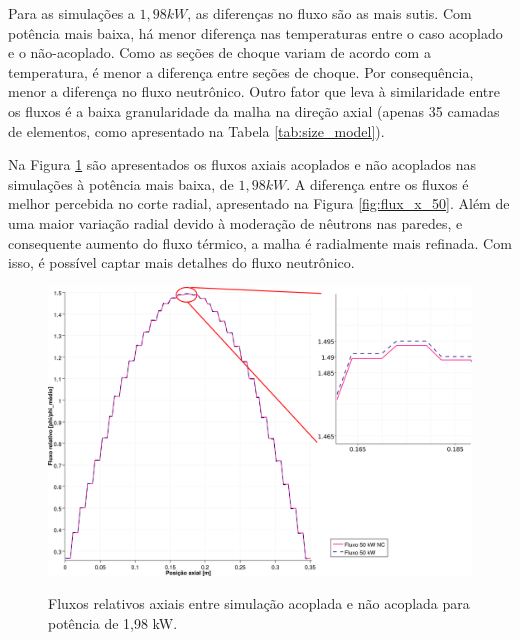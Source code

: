 Para as simulações a $1,98 kW$, as diferenças no fluxo são as mais sutis. Com potência mais baixa, há menor
diferença nas temperaturas entre o caso acoplado e o não-acoplado. Como as seções de choque variam de
acordo com a temperatura, é menor a diferença entre seções de choque. Por consequência, menor a diferença
no fluxo neutrônico. Outro fator que leva à similaridade entre os fluxos é a baixa granularidade
da malha na direção axial (apenas 35 camadas de elementos, como apresentado na Tabela \ref{tab:size_model}).

Na Figura \ref{fig:flux_z_50} são apresentados os fluxos axiais acoplados e não acoplados nas simulações
à potência mais baixa, de $1,98 kW$. A diferença entre os fluxos é melhor percebida no corte radial,
apresentado na Figura \ref{fig:flux_x_50}. Além de uma maior variação radial devido à moderação de nêutrons
nas paredes, e consequente aumento do fluxo térmico, a malha é radialmente mais refinada. Com isso, é possível
captar mais detalhes do fluxo neutrônico.


\begin{figure}[htb]
  \caption{Fluxos relativos axiais entre simulação acoplada e não acoplada para
    potência de 1,98 kW.}
  \centering\includegraphics[scale=0.5]{figuras/Flux_rel_z_50_port_trabalhado.png}
  \label{fig:flux_z_50}
\end{figure}


